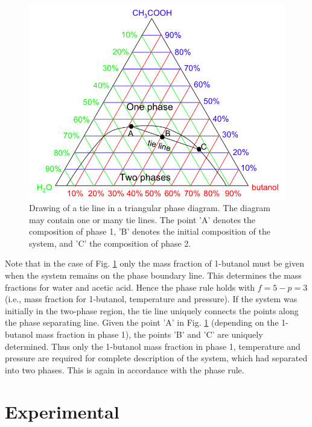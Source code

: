 \documentclass[byrevtex,amssymb,aps,pra,floatfix,letterpaper]{revtex4}
\begin{document}
\begin{figure}[!htp]
\begin{center}
\includegraphics[scale=0.5]{fig3}
\caption{Drawing of a tie line in a triangular phase diagram. The diagram may contain one or many tie lines. The point 'A' denotes the composition of phase 1, 'B' denotes the initial composition of the system, and 'C' the composition of phase 2.}
\label{fig3}
\end{center}
\end{figure}

Note that in the case of Fig. \ref{fig3} only the mass fraction of 1-butanol must be given when the system remains on the phase boundary line. This determines the mass fractions for water and acetic acid. Hence the phase rule holds with $f = 5 - p = 3$ (i.e., mass fraction for 1-butanol,  temperature and pressure). If the system was initially in the two-phase region, the tie line uniquely connects the points along the phase separating line. Given the point 'A' in Fig. \ref{fig3} (depending on the 1-butanol mass fraction in phase 1), the points 'B' and 'C' are uniquely determined. Thus only the 1-butanol mass fraction in phase 1, temperature and pressure are required for complete description of the system, which had separated into two phases. This is again in accordance with the phase rule.

\section{Experimental}
\end{document}
